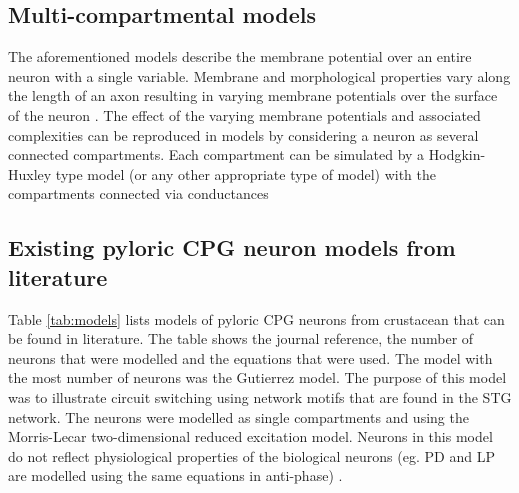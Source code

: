 \subsection{Multi-compartmental models}
The aforementioned models describe the membrane potential over an entire neuron with a single variable. Membrane and morphological properties vary along the length of an axon resulting in varying membrane potentials over the surface of the neuron \cite{Dayan2001, Sterratt2011}. The effect of the varying membrane potentials and associated complexities can be reproduced in models by considering a neuron as several connected compartments. Each compartment can be simulated by a Hodgkin-Huxley type model (or any other appropriate type of model) with the compartments connected via conductances \cite{Izhikevich2007}

\subsection{Existing pyloric \ac{CPG} neuron models from literature}
Table \ref{tab:models} lists models of pyloric \ac{CPG} neurons from crustacean that can be found in literature. The table shows the journal reference, the number of neurons that were modelled and the equations that were used. The model with the most number of neurons was the Gutierrez model. The purpose of this model was to illustrate circuit switching using network motifs that are found in the \ac{STG} network. The neurons were modelled as single compartments and using the Morris-Lecar two-dimensional reduced excitation model. Neurons in this model do not reflect physiological properties of the biological neurons (eg. \ac{PD} and \ac{LP} are modelled using the same equations in anti-phase) \cite{Gutierrez2013}.

